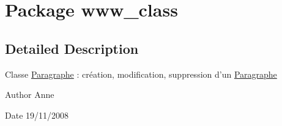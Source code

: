 \hypertarget{namespacewww__class}{
\section{Package www\_\-class}
\label{namespacewww__class}
}


\subsection{Detailed Description}
Classe \hyperlink{class_paragraphe}{Paragraphe} : cr\'{e}ation, modification, suppression d'un \hyperlink{class_paragraphe}{Paragraphe} \begin{DoxyAuthor}{Author}
Anne
\end{DoxyAuthor}
\begin{DoxyDate}{Date}
19/11/2008 
\end{DoxyDate}
